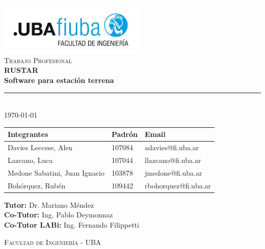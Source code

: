 \begin{titlepage}
\begin{center}

\includegraphics[width=7cm]{./images/fiuba_logo.jpg} \\[2cm]

\textsc{\Large Trabajo Profesional} \\[0.5cm]
{\huge \bfseries RUSTAR \\[0.3cm]
Software para estación terrena} \\[1cm]

\rule{\linewidth}{0.4pt} \\[1cm]

{\large \today} \\[2cm]

\hspace*{-1.5cm}
\begin{tabular}{ | l | l | l | }
    \hline
    \textbf{Integrantes} & \textbf{Padrón} & \textbf{Email} \\ \hline
    Davies Leccese, Alen & 107084 & adavies@fi.uba.ar \\ \hline
    Lazcano, Luca & 107044 & llazcano@fi.uba.ar \\ \hline
    Medone Sabatini, Juan Ignacio & 103878 & jmedone@fi.uba.ar \\ \hline
    Bohórquez, Rubén & 109442 & rbohorquez@fi.uba.ar \\ \hline
\end{tabular}

\vspace{1cm}

\textbf{Tutor:} Dr. Mariano Méndez\\[0.2cm]
\textbf{Co-Tutor:} Ing. Pablo Deymonnaz\\[0.2cm]
\textbf{Co-Tutor LABi:} Ing. Fernando Filippetti

\vfill

\textsc{Facultad de Ingeniería - UBA}

\end{center}
\end{titlepage}